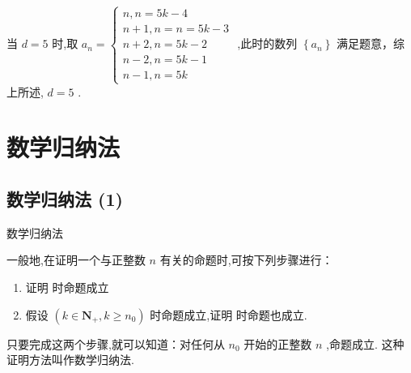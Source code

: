 \begin{enumerate}
\begin{jieda}
\begin{enumerate}
            当 $d = 5$ 时,取 ${a}_{n} = \left\{  \begin{array}{l} n,n = {5k} - 4 \\  n + 1,n = n = {5k} - 3 \\  n + 2,n = {5k} - 2 \\  n - 2,n = {5k} - 1 \\  n - 1,n = {5k} \end{array}\right.$ ,此时的数列 $\left\{  {a}_{n}\right\}$ 满足题意，综上所述, $d = 5$ .

        \end{enumerate}
    \end{jieda}
\end{enumerate}


\section*{数学归纳法}
\subsection*{数学归纳法 (1)}
\zsd 数学归纳法

一般地,在证明一个与正整数 $n$ 有关的命题时,可按下列步骤进行：
\begin{enumerate}
    \item 证明  时命题成立
    \item 假设 $\left( {k \in  {\mathbf{N}}_{ + },k \geq  {n}_{0}}\right)$ 时命题成立,证明 时命题也成立.
\end{enumerate}

只要完成这两个步骤,就可以知道：对任何从 ${n}_{0}$ 开始的正整数 $n$ ,命题成立. 这种证明方法叫作数学归纳法.

